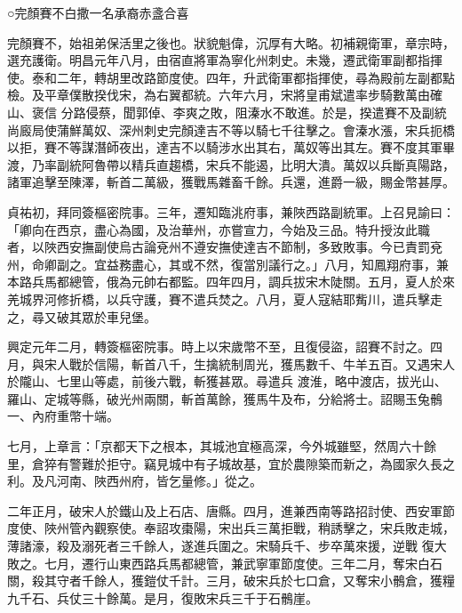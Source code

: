 
\begin{pinyinscope}

 ○完顏賽不白撒一名承裔赤盞合喜



 完顏賽不，始祖弟保活里之後也。狀貌魁偉，沉厚有大略。初補親衛軍，章宗時，選充護衛。明昌元年八月，由宿直將軍為寧化州刺史。未幾，遷武衛軍副都指揮使。泰和二年，轉胡里改路節度使。四年，升武衛軍都指揮使，尋為殿前左副都點檢。及平章僕散揆伐宋，為右翼都統。六年六月，宋將皇甫斌遣率步騎數萬由確山、褒信
 分路侵蔡，聞郭倬、李爽之敗，阻溱水不敢進。於是，揆遣賽不及副統尚廄局使蒲鮮萬奴、深州刺史完顏達吉不等以騎七千往擊之。會溱水漲，宋兵扼橋以拒，賽不等謀潛師夜出，達吉不以騎涉水出其右，萬奴等出其左。賽不度其軍畢渡，乃率副統阿魯帶以精兵直趨橋，宋兵不能遏，比明大潰。萬奴以兵斷真陽路，諸軍追擊至陳澤，斬首二萬級，獲戰馬雜畜千餘。兵還，進爵一級，賜金幣甚厚。



 貞祐初，拜同簽樞密院事。三年，遷知臨洮府事，兼陜西路副統軍。上召見諭曰：「卿向在西京，盡心為國，及治華州，亦嘗宣力，今始及三品。特升授汝此職
 者，以陜西安撫副使烏古論兗州不遵安撫使達吉不節制，多致敗事。今已責罰兗州，命卿副之。宜益務盡心，其或不然，復當別議行之。」八月，知鳳翔府事，兼本路兵馬都總管，俄為元帥右都監。四年四月，調兵拔宋木陡關。五月，夏人於來羌城界河修折橋，以兵守護，賽不遣兵焚之。八月，夏人寇結耶觜川，遣兵擊走之，尋又破其眾於車兒堡。



 興定元年二月，轉簽樞密院事。時上以宋歲幣不至，且復侵盜，詔賽不討之。四月，與宋人戰於信陽，斬首八千，生擒統制周光，獲馬數千、牛羊五百。又遇宋人於隴山、七里山等處，前後六戰，斬獲甚眾。尋遣兵
 渡淮，略中渡店，拔光山、羅山、定城等縣，破光州兩關，斬首萬餘，獲馬牛及布，分給將士。詔賜玉兔鶻一、內府重幣十端。



 七月，上章言：「京都天下之根本，其城池宜極高深，今外城雖堅，然周六十餘里，倉猝有警難於拒守。竊見城中有子城故基，宜於農隙築而新之，為國家久長之利。及凡河南、陜西州府，皆乞量修。」從之。



 二年正月，破宋人於鐵山及上石店、唐縣。四月，進兼西南等路招討使、西安軍節度使、陜州管內觀察使。奉詔攻棗陽，宋出兵三萬拒戰，稍誘擊之，宋兵敗走城，薄諸濠，殺及溺死者三千餘人，遂進兵圍之。宋騎兵千、步卒萬來援，逆戰
 復大敗之。七月，遷行山東西路兵馬都總管，兼武寧軍節度使。三年二月，奪宋白石關，殺其守者千餘人，獲鎧仗千計。三月，破宋兵於七口倉，又奪宋小鶻倉，獲糧九千石、兵仗三十餘萬。是月，復敗宋兵三千于石鶻崖。




\end{pinyinscope}
